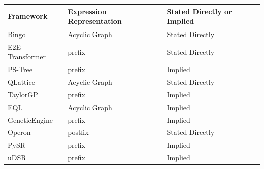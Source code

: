\documentclass[runningheads]{llncs}
\begin{document}
\begin{table}
\begin{tabular*}{\textwidth}{lll}
\hline
Framework&Expression Representation & Stated Directly or Implied\\
\hline
Bingo \cite{10.1145/3520304.3534031} &Acyclic Graph & Stated Directly\\ %
E2E Transformer \cite{kamienny2022endtoend} &prefix & Stated Directly\\ %
PS-Tree \cite{zhang2022ps} &prefix & Implied \\ %
QLattice \cite{Brolos2021AnAT} & Acyclic Graph & Stated Directly\\ %
TaylorGP \cite{10.1145/3512290.3528757} & prefix & Implied \\ %
EQL \cite{pmlr-v80-sahoo18a} & Acyclic Graph & Implied\\%
GeneticEngine \cite{10.1145/3564719.3568697} & prefix & Implied \\ %
Operon \cite{10.1145/3377929.3398099} & postfix  & Stated Directly \\ %
PySR \cite{cranmer2023interpretable} & prefix & Implied \\%
uDSR \cite{NEURIPS2022_dbca58f3} & prefix & Implied \\ %

\end{tabular*}
\end{table}
\end{document}
